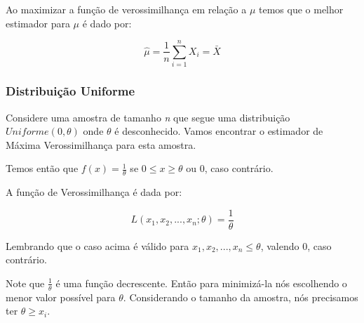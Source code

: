  Ao maximizar a função de verossimilhança em relação a  \begin{math}
 \mu
 \end{math} temos que o melhor estimador para \begin{math} \mu \end{math} é dado por:
 
\begin{equation}
\hat{\mu} = \frac{1}{n}\sum_{i=1}^{n}X_{i} = \bar{X}
\end{equation}

\subsubsection{Distribuição Uniforme}

Considere uma amostra de tamanho \emph{n} que segue uma distribuição \begin{math} Uniforme(0, \theta) \end{math} onde \begin{math} \theta \end{math} é desconhecido. Vamos encontrar o estimador de Máxima Verossimilhança para esta amostra.

Temos então que \begin{math}f(x) = \frac{1}{\theta} \end{math} se \begin{math} 0\leq x \geq \theta \end{math} ou 0, caso contrário.

A função de Verossimilhança é dada por:

\begin{equation}
L(x_{1}, x_{2}, ..., x_{n}; \theta) = \frac{1}{\theta}  
\end{equation}

Lembrando que o caso acima é válido para \begin{math} x_{1}, x_{2}, ..., x_{n} \leq \theta \end{math}, valendo 0, caso contrário.

Note que \begin{math} \frac{1}{\theta} \end{math} é uma função decrescente. Então para minimizá-la nós escolhendo o menor valor possível para \begin{math} \theta \end{math}. Considerando o tamanho da amostra, nós precisamos ter \begin{math} \theta \geq x_{i} \end{math}.

